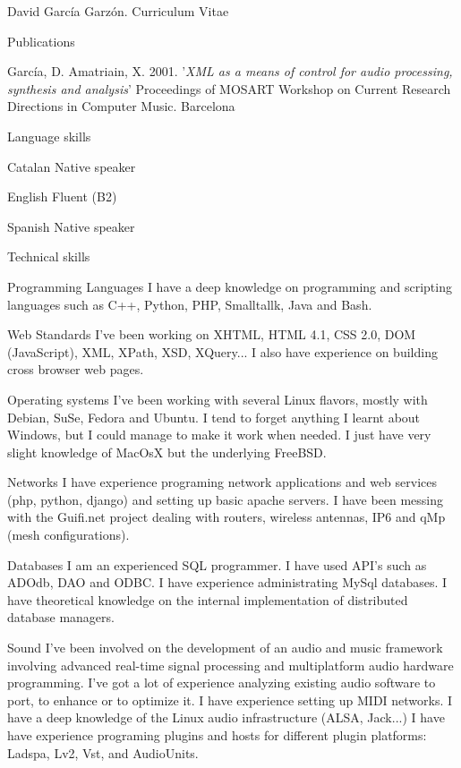 \documentclass{article}
\begin{document}
\begin{cv}{David García Garzón. Curriculum Vitae}
\begin{cvlist}{Publications}
\item[] {\sc García, D. Amatriain, X.} 2001.
'{\em XML as a means of control for audio processing, synthesis and analysis}'
Proceedings of MOSART Workshop on Current Research Directions in Computer Music. Barcelona
	
\end{cvlist}


\begin{cvlist}{Language skills}
\item[Catalan] Native speaker
\item[English] Fluent (B2)
\item[Spanish] Native speaker

\end{cvlist}

\begin{cvlist}{Technical skills}

\item[Programming Languages]
	I have a deep knowledge on programming and scripting languages such  as C++, Python, PHP, Smalltallk, Java and Bash. 

\item[Web Standards]
	I've been working on XHTML, HTML 4.1, CSS 2.0, DOM (JavaScript), XML, XPath, XSD, XQuery... I also have experience on building cross browser web pages.

\item[Operating systems]
	I've been working with several Linux flavors, mostly with Debian, SuSe, Fedora and Ubuntu. I tend to forget anything I learnt about Windows, but I could manage to make it work when needed. I just have very slight knowledge of MacOsX but the underlying FreeBSD.

\item[Networks]
	I have experience programing network applications and web services (php, python, django) and setting up basic apache servers. I have been messing with the Guifi.net project dealing with routers, wireless antennas, IP6 and qMp (mesh configurations). 

\item[Databases]
	I am an experienced SQL programmer. I have used API's such as ADOdb, DAO and ODBC. I have experience administrating MySql databases. I have theoretical knowledge on the internal implementation of distributed database managers. 

\item[Sound]
	I've been involved on the development of an audio and music framework involving advanced real-time signal processing and multiplatform audio hardware programming. I've got a lot of experience analyzing existing audio software to port, to enhance or to optimize it. I have experience setting up MIDI networks. I have a deep knowledge of the Linux audio infrastructure (ALSA, Jack...) I have have experience programing plugins and hosts for different plugin platforms: Ladspa, Lv2, Vst, and AudioUnits. 


\end{cvlist}
\end{cv}
\end{document}
